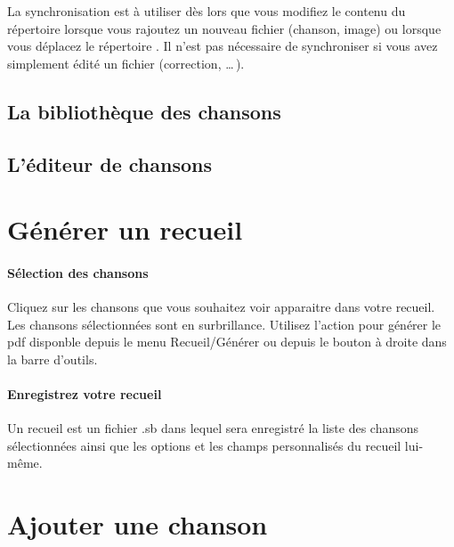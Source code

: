 \begin{nota}
  La synchronisation est à utiliser dès lors que vous modifiez le
  contenu du répertoire  lorsque vous rajoutez un nouveau
  fichier (chanson, image) ou lorsque vous déplacez le répertoire
  .  Il n'est pas nécessaire de synchroniser si vous
  avez simplement édité un fichier (correction, \dots\,).
\end{nota}

\subsection{La bibliothèque des chansons}

\subsection{L'éditeur de chansons}

\section{Générer un recueil}

\paragraph{Sélection des chansons}
Cliquez sur les chansons que vous souhaitez voir apparaitre dans votre
recueil.  Les chansons sélectionnées sont en surbrillance. Utilisez
l'action  pour générer le pdf disponble depuis le
menu Recueil/Générer ou depuis le bouton à droite dans la barre
d'outils.

\paragraph{Enregistrez votre recueil}
Un recueil est un fichier .sb dans lequel sera enregistré la liste des
chansons sélectionnées ainsi que les options et les champs
personnalisés du recueil lui-même.



\section{Ajouter une chanson}

